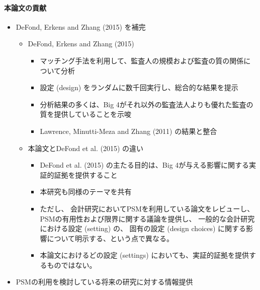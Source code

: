 \paragraph{本論文の貢献}
\begin{itemize}
 \item DeFond, Erkens and Zhang (2015) を補完
       \begin{itemize}
        \item DeFond, Erkens and Zhang (2015)
              \begin{itemize}
               \item マッチング手法を利用して、監査人の規模および監査の質の関係について分析
               \item 設定 (design) をランダムに数千回実行し、総合的な結果を提示
               \item 分析結果の多くは、Big 4がそれ以外の監査法人よりも優れた監査の質を提供していることを示唆
               \item Lawrence, Minutti-Meza and Zhang (2011) の結果と整合
              \end{itemize}
        \item 本論文とDeFond et al. (2015) の違い
              \begin{itemize}
               \item DeFond et al. (2015) の主たる目的は、Big 4が与える影響に関する実証的証拠を提供すること
               \item 本研究も同様のテーマを共有
               \item ただし、
                     会計研究においてPSMを利用している論文をレビューし、
                     PSMの有用性および限界に関する議論を提供し、
                     一般的な会計研究における設定 (setting) の、
                     固有の設定 (design choices) に関する影響について明示する、という点で異なる。
               \item 本論文におけるどの設定 (settings) においても、実証的証拠を提供するものではない。
              \end{itemize}
       \end{itemize}
 \item PSMの利用を検討している将来の研究に対する情報提供
\end{itemize}

